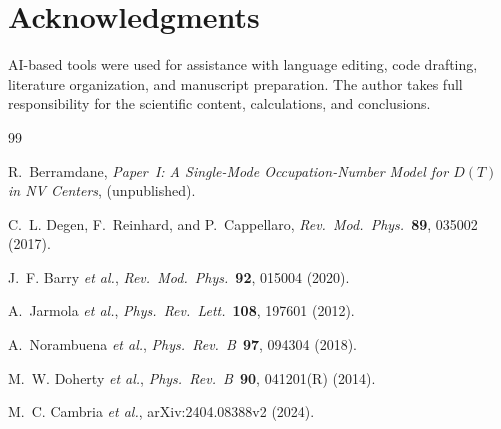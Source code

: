\documentclass[12pt,a4paper]{article}
\begin{document}
\section*{Acknowledgments}
AI-based tools were used for assistance with language editing, code drafting, literature organization, and manuscript preparation. The author takes full responsibility for the scientific content, calculations, and conclusions.


\begin{thebibliography}{99}

R.~Berramdane,
\textit{Paper~I: A Single-Mode Occupation-Number Model for $D(T)$ in NV Centers},
(unpublished).

C.~L. Degen, F.~Reinhard, and P.~Cappellaro,
\textit{Rev.\ Mod.\ Phys.}\ \textbf{89}, 035002 (2017).

J.~F. Barry \textit{et al.},
\textit{Rev.\ Mod.\ Phys.}\ \textbf{92}, 015004 (2020).

A.~Jarmola \textit{et al.},
\textit{Phys.\ Rev.\ Lett.}\ \textbf{108}, 197601 (2012).

A.~Norambuena \textit{et al.},
\textit{Phys.\ Rev.\ B}\ \textbf{97}, 094304 (2018).

M.~W. Doherty \textit{et al.},
\textit{Phys.\ Rev.\ B}\ \textbf{90}, 041201(R) (2014).

M.~C. Cambria \textit{et al.},
arXiv:2404.08388v2 (2024).

\end{thebibliography}
\end{document}
